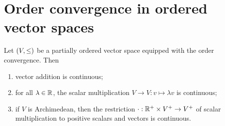 \section{Order convergence in ordered vector spaces}

\begin{proposition} \label{continuityOrderConvergenceOrderedVectorSpaces}
Let $\sSet{V, \leq}$ be a partially ordered vector space equipped with the order convergence. Then
\begin{enumerate}
\item vector addition is continuous;
\item for all $\lambda\in \mathbb{R}$, the scalar multiplication $V\to V: v \mapsto \lambda v$ is continuous;
\item if $V$ is Archimedean, then the restriction $\cdot: \mathbb{R}^+ \times V^+ \to V^+$ of scalar multiplication to positive scalars and vectors is continuous.
\end{enumerate}
\end{proposition}
